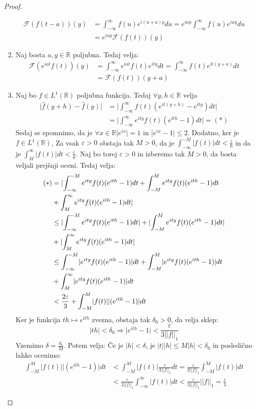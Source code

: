 \documentclass[a4paper, 10pt]{article}
\newcommand{\abs}[1]{\ensuremath{\lvert #1 \rvert}}
\newcommand{\mth}[1]{\ensuremath{\mathbb{#1}}}
\newcommand{\R}{\mth{R}}
\begin{document}
\begin{proof}
\begin{enumerate}
\begin{align*}
						\mathcal{F}(f(t-a))(y) &= \int_{-\infty}^{\infty}f(u)e^{i(u+a)y}du = e^{iay}\int_{-\infty}^{\infty}f(u)e^{iuy}du \\ &= e^{iay}\mathcal{F}(f(t))(y)
					\end{align*}
					\item Naj bosta $a, y\in\R$ poljubna. Tedaj velja: \begin{align*}
						\mathcal{F}(e^{iat}f(t))(y) &= \int_{-\infty}^{\infty}e^{iat}f(t)e^{ity}dt =\int_{-\infty}^{\infty}f(t)e^{it(y+a)}dt \\
						&= \mathcal{F}(f(t))(y+a)
					\end{align*}
					\item Naj bo $f\in L^1(\R)$ poljubna funkcija. Tedaj $\forall y, h\in \R$ velja \begin{align*}
					\abs{\hat{f}(y+h) - \hat{f}(y)} &= \abs{\int_{-\infty}^{\infty}f(t)(e^{it(y+h)}- e^{ity})dt} \\ &= \abs{\int_{-\infty}^{\infty}e^{ity}f(t)(e^{ith}-1)dt} = (*)
					\end{align*}
					Sedaj se spomnimo, da je $\forall x \in\R \abs{e^{ix}} = 1$ in $\abs{e^{ix} - 1} \leq 2$. Dodatno, ker je $f\in L^1(\R)$, Za vsak $\varepsilon>0$ obstaja tak $M>0$, da je $\int_{-\infty}^{-M}\abs{f(t)}dt < \frac{\varepsilon}{6}$ in da je $\int_{M}^{\infty}\abs{f(t)}dt < \frac{\varepsilon}{6}$. Naj bo torej $\varepsilon>0$ in izberemo tak $M>0$, da bosta veljali prejšnji oceni. Tedaj velja: \begin{align*}
						(*) &= \abs{\int_{-\infty}^{-M}e^{ity}f(t)(e^{ith}-1)dt + \int_{-M}^{M}e^{ity}f(t)(e^{ith}-1)dt \\ 
							&+ \int_{M}^{\infty}e^{ity}f(t)(e^{ith}-1)dt} \\
						&\leq \abs{\int_{-\infty}^{-M}e^{ity}f(t)(e^{ith}-1)dt} + \abs{\int_{-M}^{M}e^{ity}f(t)(e^{ith}-1)dt} \\
						&+ \abs{\int_{M}^{\infty}e^{ity}f(t)(e^{ith}-1)dt} \\
						&\leq \int_{-\infty}^{-M}\abs{e^{ity}f(t)(e^{ith}-1)}dt + \int_{-M}^{M}\abs{e^{ity}f(t)(e^{ith}-1)}dt \\
						&+ \int_{M}^{\infty}\abs{e^{ity}f(t)(e^{ith}-1)}dt \\
						&< \frac{2\varepsilon}{3} + \int_{-M}^{M}\abs{f(t)}\abs{(e^{ith}-1)}dt
					\end{align*}
					Ker je funkcija $th\mapsto e^{ith}$ zvezna, obstaja tak $\delta_0 > 0$, da velja sklep: 
					$$\abs{th} < \delta_0 \Rightarrow \abs{e^{ith} - 1} < \frac{\varepsilon}{3\abs{\abs{f}}_1}$$
					Vzemimo $\delta = \frac{\delta_0}{M}$. Potem velja: Če je $\abs{h} < \delta$, je $\abs{t}\abs{h}\leq M\abs{h} < \delta_0$ in posledično lahko ocenimo: \begin{align*}
						\int_{-M}^{M}\abs{f(t)}\abs{(e^{ith}-1)}dt &< \int_{-M}^{M}\abs{f(t)}\frac{\varepsilon}{3\abs{\abs{f}}_1}dt = \frac{\varepsilon}{3\abs{\abs{f}}_1}\int_{-M}^{M}\abs{f(t)}dt \\
						&< \frac{\varepsilon}{3\abs{\abs{f}}_1}\int_{-\infty}^{\infty}\abs{f(t)}dt < \frac{\varepsilon}{3\abs{\abs{f}}_1}\abs{\abs{f}}_1 = \frac{\varepsilon}{3}
					\end{align*}
					

\end{enumerate}
\end{proof}
\end{document}
